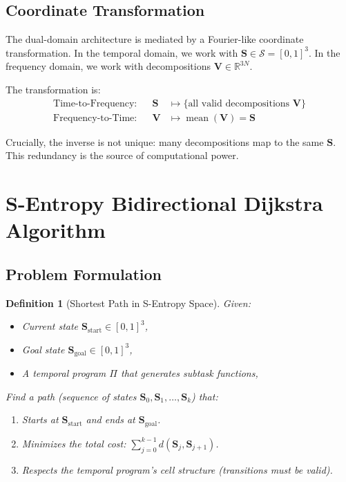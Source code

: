 \documentclass[twocolumn,11pt,a4paper]{article}
\newtheorem{definition}[theorem]{Definition}
\newcommand{\Stuple}{\mathbf{S}}
\DeclareMathOperator{\mean}{mean}
\begin{document}
\subsection{Coordinate Transformation}

The dual-domain architecture is mediated by a Fourier-like coordinate transformation. In the temporal domain, we work with $\Stuple \in \mathcal{S} = [0,1]^3$. In the frequency domain, we work with decompositions $\mathbf{V} \in \mathbb{R}^{3N}$.

The transformation is:
\begin{align}
\text{Time-to-Frequency}: && \Stuple &\mapsto \{\text{all valid decompositions } \mathbf{V}\}\\
\text{Frequency-to-Time}: && \mathbf{V} &\mapsto \mean(\mathbf{V}) = \Stuple
\end{align}

Crucially, the inverse is not unique: many decompositions map to the same $\Stuple$. This redundancy is the source of computational power.

\section{S-Entropy Bidirectional Dijkstra Algorithm}
\label{sec:algorithm}

\subsection{Problem Formulation}

\begin{definition}[Shortest Path in S-Entropy Space]
Given:
\begin{itemize}[nosep,leftmargin=1em]
  \item Current state $\Stuple_{\text{start}} \in [0,1]^3$,
  \item Goal state $\Stuple_{\text{goal}} \in [0,1]^3$,
  \item A temporal program $\Pi$ that generates subtask functions,
\end{itemize}
Find a \emph{path} (sequence of states $\Stuple_0, \Stuple_1, \ldots, \Stuple_k$) that:
\begin{enumerate}[nosep,label=(\roman*)]
  \item Starts at $\Stuple_{\text{start}}$ and ends at $\Stuple_{\text{goal}}$.
  \item Minimizes the total cost: $\sum_{j=0}^{k-1} d(\Stuple_j, \Stuple_{j+1})$.
  \item Respects the temporal program's cell structure (transitions must be valid).
\end{enumerate}
\end{definition}
\end{document}
